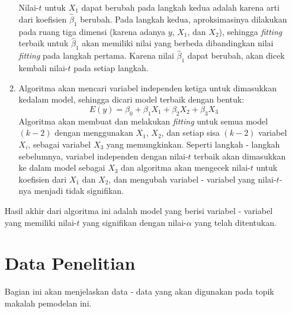 \begin{enumerate}
\begin{enumerate}
    Nilai-$t$ untuk $X_1$ dapat berubah pada langkah kedua adalah karena arti dari koefisien $\hat{\beta}_1$ berubah. Pada langkah kedua, aproksimasinya dilakukan pada ruang tiga dimensi (karena adanya $y$, $X_1$, dan $X_2$), sehingga \textit{fitting} terbaik untuk $\hat{\beta}_1$ akan memiliki nilai yang berbeda dibandingkan nilai \textit{fitting} pada langkah pertama. Karena nilai $\hat{\beta}_1$ dapat berubah, akan dicek kembali nilai-$t$ pada setiap langkah.
    \item Algoritma akan mencari variabel independen ketiga untuk dimasukkan kedalam model, sehingga dicari model terbaik dengan bentuk:
    \begin{equation*}
        E(y) = \beta_0 + \beta_1 X_1 + \beta_2 X_2 + \beta_3 X_3 
    \end{equation*}
    Algoritma akan membuat dan melakukan \textit{fitting} untuk semua model $(k - 2)$ dengan menggunakan $X_1$, $X_2$, dan setiap sisa $(k - 2)$ variabel $X_i$, sebagai variabel $X_3$ yang memungkinkan. Seperti langkah - langkah sebelumnya, variabel independen dengan nilai-$t$ terbaik akan dimasukkan ke dalam model sebagai $X_3$ dan algoritma akan mengecek nilai-$t$ untuk koefisien dari $X_1$ dan $X_2$, dan mengubah variabel - variabel yang nilai-$t$-nya menjadi tidak signifikan.
\end{enumerate}
Hasil akhir dari algoritma ini adalah model yang berisi variabel - variabel yang memiliki nilai-$t$ yang signifikan dengan nilai-$\alpha$ yang telah ditentukan.


\section{Data Penelitian}
Bagian ini akan menjelaskan data - data yang akan digunakan pada topik makalah pemodelan ini.

\end{enumerate}
